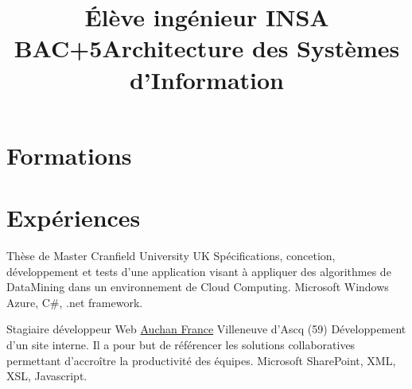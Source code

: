 \documentclass[11pt,a4paper,fr]{moderncv}
\title{Élève ingénieur INSA BAC+5\newline{}\large{Architecture des Systèmes d'Information\newline{}\newline{}}}               %
\begin{document}
\maketitle

\section{Formations}



\section{Expériences}

 {Thèse de Master} {Cranfield University} {UK} {} {\obj 
Spécifications, concetion, développement et tests d'une application visant à appliquer des algorithmes de DataMining dans un environnement de Cloud Computing.
\newline{}\techUsed 
Microsoft Windows Azure, C\#, .net framework.}

 {Stagiaire développeur Web} {\href{http://www.auchan.fr/}{Auchan France}} {Villeneuve d'Ascq (59)} {} {\obj Développement d'un site interne. Il a pour but de référencer les solutions collaboratives permettant d'accroître la productivité des équipes.\newline{}\techUsed 
Microsoft SharePoint\texttrademark, XML, XSL, Javascript.}
\end{document}

